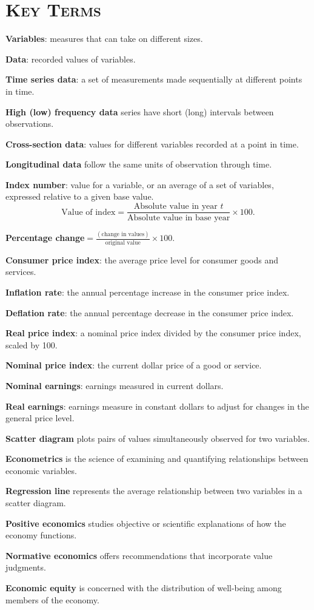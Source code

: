 \newpage
{}
	\section*{\textsc{Key Terms}}
\begin{keyterms}
\textbf{Variables}: measures that can take on different sizes.

\textbf{Data}: recorded values of variables.

\textbf{Time series data}: a set of measurements made sequentially at different points in time.

\textbf{High (low) frequency data} series have short (long) intervals between observations.

\textbf{Cross-section data}: values for different variables recorded at a point in time.

\textbf{Longitudinal data} follow the same units of observation through time.

\textbf{Index number}: value for a variable, or an average of a set of variables, expressed relative to a given base value.
\begin{equation*}
\text{Value of index}=\frac{\text{Absolute value in year }t}{\text{Absolute value in base year}}\times 100. 
\end{equation*}

\textbf{Percentage change}$=\displaystyle\frac{(\text{change in values})}{\text{original value}}\times 100$.

\textbf{Consumer price index}: the average price level for consumer goods and services.

\textbf{Inflation rate}: the annual percentage increase in the consumer price index.

\textbf{Deflation rate}: the annual percentage decrease in the consumer price index.

\textbf{Real price index}: a nominal price index divided by the consumer price index, scaled by 100.

\textbf{Nominal price index}: the current dollar price of a good or service.

\textbf{Nominal earnings}: earnings measured in current dollars.

\textbf{Real earnings}: earnings measure in constant dollars to adjust for changes in the general price level.

\textbf{Scatter diagram} plots pairs of values simultaneously observed for two variables.

\textbf{Econometrics} is the science of examining and quantifying relationships between economic variables.

\textbf{Regression line} represents the average relationship between two variables in a scatter diagram.

\textbf{Positive economics} studies objective or scientific explanations of how the economy functions.

\textbf{Normative economics} offers recommendations that incorporate value judgments.

\textbf{Economic equity} is concerned with the distribution of well-being among members of the economy.
\end{keyterms}